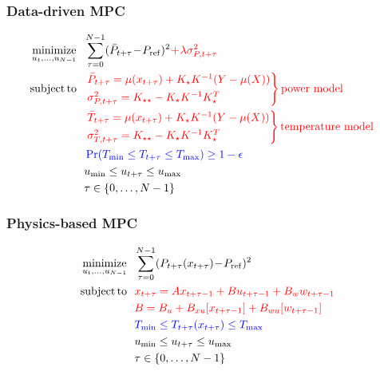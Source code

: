 \begin{frame}[t]
	
	\frametitle{Data-driven MPC}
	
	\begin{align*}
	&\operatorname*{minimize}_{u_t,\dots,u_{N-1}} \  \  \sum_{\tau=0}^{N-1} (\bar{P}_{t+\tau}\!-\!P_{\mathrm{ref}})^2 \color{red} \!+\! \lambda \sigma^2_{P,t+\tau}\\
	&
	\begin{aligned}
	\operatorname*{subject\,to} \  \  
	&  \color{red} \begin{rcases}
	\color{red} \bar{P}_{t+\tau} = \mu(x_{t+\tau}) + K_\star K^{-1} (Y - \mu(X)) \nonumber\\
	\color{red} \sigma^2_{P,t+\tau} = K_{\star \star} - K_\star K^{-1} K_\star^T
	\end{rcases}  \color{red} \text{power model}\\
	& \color{red} \begin{rcases}
	\color{red} \bar{T}_{t+\tau} = \mu(x_{t+\tau}) + K_\star K^{-1} (Y - \mu(X)) \nonumber\\
	\color{red} \sigma^2_{T,t+\tau} = K_{\star \star} - K_\star K^{-1} K_\star^T
	\end{rcases} \color{red} \text{temperature model}\\
	& \color{blue} \Pr(T_{\mathrm{min}} \leq T_{t+\tau} \leq T_{\mathrm{max}}) \geq 1 - \epsilon \\	
	& u_{\mathrm{min}} \leq u_{t+\tau} \leq u_{\mathrm{max}} \\
	& \tau \in \{ 0, \dots, N-1 \}
	\end{aligned}
	\end{align*}
	
\end{frame}

\begin{frame}[t]
	
	\frametitle{Physics-based MPC}
	
	\begin{align*}
	&\operatorname*{minimize}_{u_t,\dots,u_{N-1}} \  \  \sum_{\tau=0}^{N-1} (P_{t+\tau}(x_{t+\tau})\!-\!P_{\mathrm{ref}})^2 \color{red} \\
	&
	\begin{aligned}
	\operatorname*{subject\,to} \  \  
	& \color{red}x_{t+\tau} =  Ax_{t+\tau-1} + B u_{t+\tau-1} + B_w w_{t+\tau-1} \\
	& \color{red}B = B_u + B_{xu}[x_{t+\tau-1}] + B_{wu}[w_{t+\tau-1}] \\
	& \color{blue} T_{\mathrm{min}} \leq T_{t+\tau}(x_{t+\tau}) \leq T_{\mathrm{max}} \\	
	& u_{\mathrm{min}} \leq u_{t+\tau} \leq u_{\mathrm{max}} \\
	& \tau \in \{ 0, \dots, N-1 \}
	\end{aligned}
	\end{align*}
	
\end{frame}

